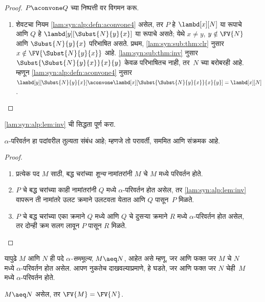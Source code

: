 \begin{proof}
  $P \aconvone Q$ च्या निष्पत्ती वर विगमन करू.
  \begin{enumerate}
  \item शेवटचा नियम \ref{lam:syn:alp:defn:aconvone4} असेल, तर $P$
    हे $\lambd[x][N]$ या रूपाचे आणि $Q$ हे
    $\lambd[y][\Subst{N}{y}{x}]$ या रूपाचे असते;
    येथे $x \neq y$, $y \notin \FV{N}$ आणि
    $\Subst{N}{y}{x}$ परिभाषित असते. प्रथम,
    \ref{lam:syn:sub:thm:clr} नुसार $x \notin
    \FV{\Subst{N}{y}{x}}$ आहे. \ref{lam:syn:sub:thm:inv}
    नुसार $\Subst{\Subst{N}{y}{x}}{x}{y}$ केवळ
    परिभाषितच नाही, तर~$N$ च्या बरोबरही आहे. म्हणून
    \ref{lam:syn:alp:defn:aconvone4} नुसार
    $\lambd[y][\Subst{N}{y}{x}]
    \aconvone \lambd[x][\Subst{\Subst{N}{y}{x}}{x}{y}] =
    \lambd[x][N]$.
  \end{enumerate}
\end{proof}

\begin{prob}
  \ref{lam:syn:alp:lem:inv} ची सिद्धता पूर्ण करा.
\end{prob}

\begin{thm}
  $\alpha$-परिवर्तन हा पदांवरील तुल्यता संबंध आहे;
  म्हणजे तो परावर्ती, सममित आणि संक्रमक आहे.
\end{thm}

\begin{proof}
  \begin{enumerate}
  \item प्रत्येक पद $M$ साठी, बद्ध चरांच्या \emph{शून्य}
    नामांतरांनी $M$ चे $M$ मध्ये परिवर्तन होते.
  \item $P$ चे बद्ध चरांच्या काही नामांतरांनी $Q$ मध्ये
    $\alpha$-परिवर्तन होत असेल, तर \ref{lam:syn:alp:lem:inv}
    वापरून ती नामांतरे उलट क्रमाने उलटवता येतात आणि
    $Q$ पासून~$P$ मिळते.
  \item $P$ चे बद्ध चरांच्या एका क्रमाने $Q$ मध्ये आणि
    $Q$ चे दुसऱ्या क्रमाने $R$ मध्ये $\alpha$-परिवर्तन
    होत असेल, तर दोन्ही क्रम सलग लावून $P$ पासून
    $R$ मिळते.
  \end{enumerate}
\end{proof}

यापुढे $M$ आणि $N$ ही पदे \emph{$\alpha$-सममूल्य},
$M \aeq N$, आहेत असे म्हणू, जर आणि फक्त जर $M$ चे $N$ मध्ये
$\alpha$-परिवर्तन होत असेल. आपण नुकतेच दाखवल्याप्रमाणे,
हे घडते, जर आणि फक्त जर $N$ चेही~$M$ मध्ये
$\alpha$-परिवर्तन होते.

\begin{thm}\label{lam:syn:alp:thm:fv}
  $M \aeq N$ असेल, तर $\FV{M} = \FV{N}$.
\end{thm}

